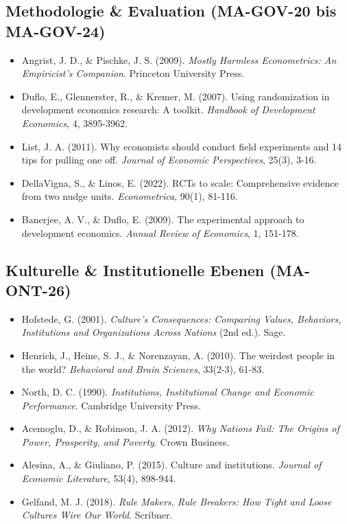 \subsection*{Methodologie \& Evaluation (MA-GOV-20 bis MA-GOV-24)}

\begin{itemize}[leftmargin=*]
    \item Angrist, J. D., \& Pischke, J. S. (2009). \textit{Mostly Harmless Econometrics: An Empiricist's Companion}. Princeton University Press.
    \item Duflo, E., Glennerster, R., \& Kremer, M. (2007). Using randomization in development economics research: A toolkit. \textit{Handbook of Development Economics}, 4, 3895-3962.
    \item List, J. A. (2011). Why economists should conduct field experiments and 14 tips for pulling one off. \textit{Journal of Economic Perspectives}, 25(3), 3-16.
    \item DellaVigna, S., \& Linos, E. (2022). RCTs to scale: Comprehensive evidence from two nudge units. \textit{Econometrica}, 90(1), 81-116.
    \item Banerjee, A. V., \& Duflo, E. (2009). The experimental approach to development economics. \textit{Annual Review of Economics}, 1, 151-178.
\end{itemize}

\subsection*{Kulturelle \& Institutionelle Ebenen (MA-ONT-26)}

\begin{itemize}[leftmargin=*]
    \item Hofstede, G. (2001). \textit{Culture's Consequences: Comparing Values, Behaviors, Institutions and Organizations Across Nations} (2nd ed.). Sage.
    \item Henrich, J., Heine, S. J., \& Norenzayan, A. (2010). The weirdest people in the world? \textit{Behavioral and Brain Sciences}, 33(2-3), 61-83.
    \item North, D. C. (1990). \textit{Institutions, Institutional Change and Economic Performance}. Cambridge University Press.
    \item Acemoglu, D., \& Robinson, J. A. (2012). \textit{Why Nations Fail: The Origins of Power, Prosperity, and Poverty}. Crown Business.
    \item Alesina, A., \& Giuliano, P. (2015). Culture and institutions. \textit{Journal of Economic Literature}, 53(4), 898-944.
    \item Gelfand, M. J. (2018). \textit{Rule Makers, Rule Breakers: How Tight and Loose Cultures Wire Our World}. Scribner.
\end{itemize}


\appendix

